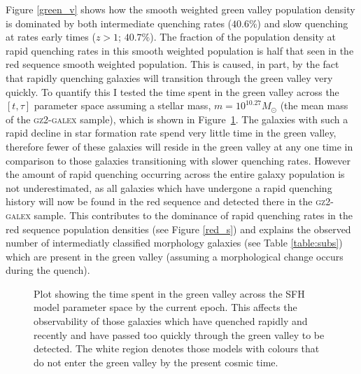 Figure \ref{green_v} shows how the smooth weighted green valley population density is dominated by both intermediate quenching rates ($40.6\%$) and slow quenching at rates early times ($z > 1$; $40.7\%$). The fraction of the population density at rapid quenching rates in this smooth weighted population is half that seen in the red sequence smooth weighted population. This is caused, in part, by the fact that rapidly quenching galaxies will transition through the green valley very quickly. To quantify this I tested the time spent in the green valley across the $[t, \tau]$ parameter space assuming a stellar mass, $m = 10^{10.27} M_{\odot}$ (the mean mass of the \textsc{gz2-galex} sample), which is shown in Figure~\ref{fig:timeingv}. The galaxies with such a rapid decline in star formation rate spend very little time in the green valley, therefore fewer of these galaxies will reside in the green valley at any one time in comparison to those galaxies transitioning with slower quenching rates. However the amount of rapid quenching occurring across the entire galaxy population is not underestimated, as all galaxies which have undergone a rapid quenching history will now be found in the red sequence and detected there in the \textsc{gz2-galex} sample.  This contributes to the dominance of rapid quenching rates in the red sequence population densities (see Figure \ref{red_s}) and explains the observed number of intermediatly classified morphology galaxies (see Table \ref{table:subs}) which are present in the green valley (assuming a morphological change occurs during the quench).

\begin{figure}
\caption[Time spent in the green valley across parameter space]{Plot showing the time spent in the green valley across the SFH model parameter space by the current epoch. This affects the observability of those galaxies which have quenched rapidly and recently and have passed too quickly through the green valley to be detected. The white region denotes those models with colours that do not enter the green valley by the present cosmic time.}
\label{fig:timeingv}
\end{figure}

